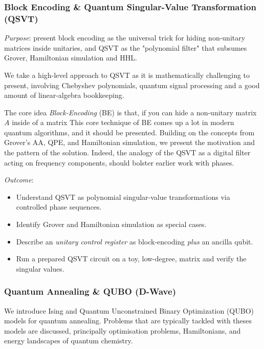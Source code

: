 \subsubsection*{Block Encoding \& Quantum Singular-Value Transformation (QSVT)}

\emph{Purpose}: present block encoding as the universal trick for hiding non-unitary matrices inside unitaries, 
and QSVT as the "polynomial filter" that subsumes Grover, Hamiltonian simulation and HHL.

We take a high-level approach to QSVT as it is mathematically challenging to present, involving Chebyshev polynomials,
quantum signal processing and a good amount of linear-algebra bookkeeping.

The core idea \emph{Block-Encoding} (BE) is that, if you can hide a non-unitary matrix $A$ inside of a matrix 
This core technique of BE comes up a lot in modern quantum algorithms, and it should be presented.  
Building on the concepts from Grover's AA, QPE, and Hamiltonian simulation, we present the motivation 
and the pattern of the solution.  
Indeed, the analogy of the QSVT as a digital filter acting on frequency components, should bolster earlier work with phases.

\emph{Outcome}:
\begin{itemize}
	\item Understand QSVT as polynomial singular-value transformations via controlled phase sequences.
	\item Identify Grover and Hamiltonian simulation as special cases.
	\item Describe an \emph{unitary control register} as block-encoding \emph{plus} an ancilla qubit.
	\item Run a prepared QSVT circuit on a toy, low-degree, matrix and verify the singular values.
\end{itemize} 

\subsubsection*{Quantum Annealing \& QUBO (D-Wave)}

We introduce Ising and Quantum Unconstrained Binary Optimization (QUBO) models for quantum annealing.  
Problems that are typically tackled with theses models are discussed, 
principally optimisation problems, Hamiltonians, and energy landscapes of quantum chemistry.

